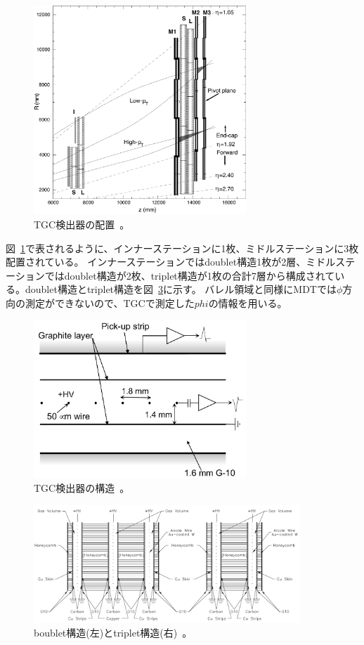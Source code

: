 \begin{figure}[h]
  \centering
  \includegraphics[clip, width=8cm]{fig/2/l1mue-schema.pdf}
  \caption{TGC検出器の配置~\cite{Aad:1129811}。}
  \label{fig:2-18}
\end{figure}

図~\ref{fig:2-18}で表されるように、インナーステーションに1枚、ミドルステーションに3枚配置されている。
インナーステーションではdoublet構造1枚が2層、ミドルステーションではdoublet構造が2枚、triplet構造が1枚の合計7層から構成されている。doublet構造とtriplet構造を図~\ref{fig:2-20}に示す。
バレル領域と同様にMDTでは$\phi$方向の測定ができないので、TGCで測定した$phi$の情報を用いる。

\begin{figure}[h]
  \centering
  \includegraphics[clip, width=8cm]{fig/2/TGC_anode_wire.pdf}
  \caption{TGC検出器の構造~\cite{Aad:1129811}。}
  \label{fig:2-19}
\end{figure}

\begin{figure}[h]
  \centering
  \includegraphics[clip, width=10cm]{fig/2/TGC_construction.pdf}
  \caption{boublet構造(左)とtriplet構造(右)~\cite{Aad:1129811}。}
  \label{fig:2-20}
\end{figure}

